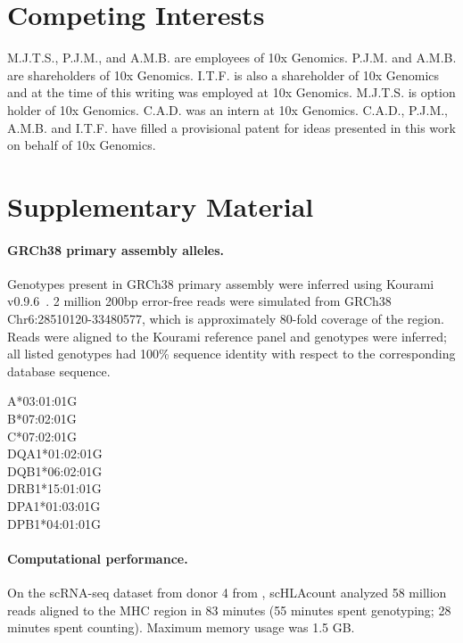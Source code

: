\documentclass{article}[12pt]
\newcommand{\beginsupplement}{%
\setcounter{table}{0}
\renewcommand{\thetable}{S\arabic{table}}%
\setcounter{figure}{0}
\renewcommand{\thefigure}{S\arabic{figure}}%
}
\begin{document}
\section*{Competing Interests}

M.J.T.S., P.J.M., and A.M.B. are employees of 10x Genomics. P.J.M. and A.M.B. are shareholders of 10x Genomics. I.T.F. is also a shareholder of 10x Genomics and at the time of this writing was employed at 10x Genomics. M.J.T.S. is option holder of 10x Genomics. C.A.D. was an intern at 10x Genomics. C.A.D., P.J.M., A.M.B. and I.T.F. have filled a provisional patent for ideas presented in this work on behalf of 10x Genomics.

\newpage

\printbibliography

\newpage
\FloatBarrier

\section*{Supplementary Material}
\beginsupplement

\paragraph*{GRCh38 primary assembly alleles.}

Genotypes present in GRCh38 primary assembly were inferred using Kourami v0.9.6~\parencite{kourami}. 2 million 200bp error-free reads were simulated from GRCh38 Chr6:28510120-33480577, which is approximately 80-fold coverage of the region. Reads were aligned to the Kourami reference panel and genotypes were inferred; all listed genotypes had 100\% sequence identity with respect to the corresponding database sequence.

\noindent A*03:01:01G  \\
B*07:02:01G  \\
C*07:02:01G  \\
DQA1*01:02:01G  \\
DQB1*06:02:01G  \\
DRB1*15:01:01G  \\
DPA1*01:03:01G  \\
DPB1*04:01:01G  \\

\paragraph*{Computational performance.}

On the scRNA-seq dataset from donor 4 from \cite{vdjappnote}, scHLAcount analyzed 58 million reads aligned to the MHC region in 83 minutes (55 minutes spent genotyping; 28 minutes spent counting). Maximum memory usage was 1.5 GB.
\end{document}
